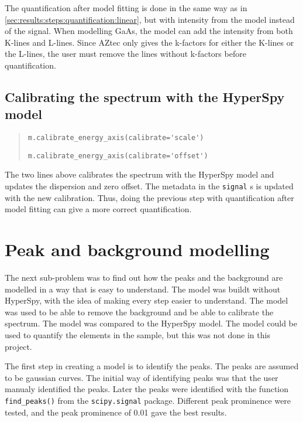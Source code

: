 The quantification after model fitting is done in the same way as in \cref{sec:results:steps:quantification:linear}, but with intensity from the model instead of the signal.
When modelling GaAs, the model can add the intensity from both K-lines and L-lines.
Since AZtec only gives the k-factors for either the K-lines or the L-lines, the user must remove the lines without k-factors before quantification.


\subsection{Calibrating the spectrum with the HyperSpy model}
\label{sec:results:steps:HyperSpycalibration}

\begin{quote}

    \verb|m.calibrate_energy_axis(calibrate='scale')|

    \verb|m.calibrate_energy_axis(calibrate='offset')|

\end{quote}

The two lines above calibrates the spectrum with the HyperSpy model and updates the dispersion and zero offset.
The metadata in the \verb|signal| s is updated with the new calibration.
Thus, doing the previous step with quantification after model fitting can give a more correct quantification.
%
%
%

%
%
\section{Peak and background modelling}
\label{sec:results:modelling}

The next sub-problem was to find out how the peaks and the background are modelled in a way that is easy to understand.
The model was buildt without HyperSpy, with the idea of making every step easier to understand.
The model was used to be able to remove the background and be able to calibrate the spectrum.
The model was compared to the HyperSpy model.
The model could be used to quantify the elements in the sample, but this was not done in this project.

The first step in creating a model is to identify the peaks.
The peaks are assumed to be gaussian curves.
The initial way of identifying peaks was that the user manualy identified the peaks.
Later the peaks were identified with the function \verb|find_peaks()| from the \verb|scipy.signal| package.
Different peak prominence were tested, and the peak prominence of 0.01 gave the best results.


